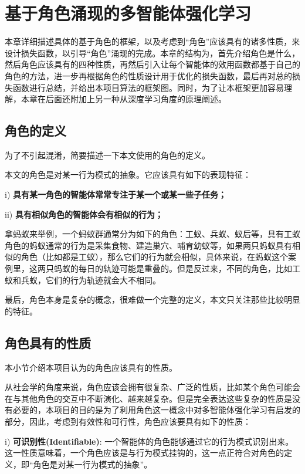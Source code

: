 
\chapter{基于角色涌现的多智能体强化学习}
本章详细描述具体的基于角色的框架，以及考虑到“角色”应该具有的诸多性质，来设计损失函数，以引导“角色”涌现的完成。本章的结构为，首先介绍角色是什么，然后角色应该具有的四种性质，再然后引入让每个智能体的效用函数都基于自己的角色的方法，进一步再根据角色的性质设计用于优化的损失函数，最后再对总的损失函数进行总结，并给出本项目算法的框架图。同时，为了让本框架更加容易理解，本章在后面还附加上另一种从深度学习角度的原理阐述。

\section{角色的定义}
为了不引起混淆，简要描述一下本文使用的角色的定义。

本文的角色是对某一行为模式的抽象。它应该具有如下的表现特征：

i) \textbf{具有某一角色的智能体常常专注于某一个或某一些子任务；}

ii) \textbf{具有相似角色的智能体会有相似的行为；}

拿蚂蚁来举例，一个蚂蚁群通常分为如下的角色：工蚁、兵蚁、蚁后等，具有工蚁角色的蚂蚁通常的行为是采集食物、建造巢穴、哺育幼蚁等，如果两只蚂蚁具有相似的角色（比如都是工蚁），那么它们的行为就会相似，具体来说，在蚂蚁这个案例里，这两只蚂蚁的每日的轨迹可能是重叠的。但是反过来，不同的角色，比如工蚁和兵蚁，它们的行为轨迹就会大不相同。

最后，角色本身是复杂的概念，很难做一个完整的定义，本文只关注那些比较明显的特征。


\section{角色具有的性质}
本小节介绍本项目认为的角色应该具有的性质。

从社会学的角度来说，角色应该会拥有很复杂、广泛的性质，比如某个角色可能会在与其他角色的交互中不断演化、越来越复杂。但是完全表达这些复杂的性质是没有必要的，本项目的目的是为了利用角色这一概念中对多智能体强化学习有启发的部分，因此，考虑到有效性和可行性，角色应该要具有如下的性质：

i) \textbf{可识别性(Identifiable)}: 一个智能体的角色能够通过它的行为模式识别出来。这一性质意味着，一个角色应该是与行为模式挂钩的，这一点正符合对角色的定义，即“角色是对某一行为模式的抽象”。

